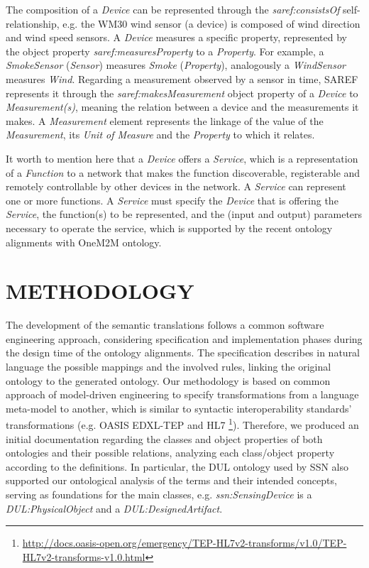 \documentclass{sig-alternate-05-2015}
\begin{document}
The composition of a \textit{Device} can be represented through the \textit{saref:\-consistsOf} self-relationship, e.g. the WM30 wind sensor (a device) is composed of wind direction and wind speed sensors. A \textit{Device} measures a specific property, represented by the object property \textit{saref:\-measuresProperty} to a \textit{Property}. For example, a \textit{SmokeSensor} (\textit{Sensor}) measures \textit{Smoke} (\textit{Property}), analogously a \textit{WindSensor} measures \textit{Wind}. Regarding a measurement observed by a sensor in time, SAREF represents it through the \textit{saref:\-makesMeasurement} object property of a \textit{Device} to \textit{Measurement(s)}, meaning the relation between a device and the measurements it makes. A \textit{Measurement} element represents the linkage of the value of the \textit{Measurement}, its \textit{Unit of Measure} and the \textit{Property} to which it relates. 

It worth to mention here that a \textit{Device} offers a \textit{Service}, which is a representation of a \textit{Function} to a network that makes the function discoverable, registerable and remotely controllable by other devices in the network. A \textit{Service} can represent one or more functions. A \textit{Service} must specify the \textit{Device} that is offering the \textit{Service}, the function(s) to be represented, and the (input and output) parameters necessary to operate the service, which is supported by the recent ontology alignments with OneM2M ontology. 


\section{METHODOLOGY}
The development of the semantic translations follows a common software engineering approach, considering specification and implementation phases during the design time of the ontology alignments. The specification describes in natural language the possible mappings and the involved rules, linking the original ontology to the generated ontology. Our methodology is based on common approach of model-driven engineering to specify transformations from a language meta-model to another, which is similar to syntactic interoperability standards' transformations (e.g. OASIS EDXL-TEP and HL7 \footnote{\url{http://docs.oasis-open.org/emergency/TEP-HL7v2-transforms/v1.0/TEP-HL7v2-transforms-v1.0.html}}). Therefore, we produced an initial documentation regarding the classes and object properties of both ontologies and their possible relations, analyzing each class/object property according to the definitions. In particular, the DUL ontology used by SSN also supported our ontological analysis of the terms and their intended concepts, serving as foundations for the main classes, e.g. \textit{ssn:\-SensingDevice} is a \textit{DUL:PhysicalObject} and a \textit{DUL:\-Designed\-Artifact}.
\end{document}

